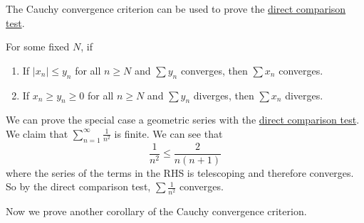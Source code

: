   The Cauchy convergence criterion can be used to prove the \hyperref[thm:direct-comparison-test]{direct comparison test}. 

  \begin{theorem}
    \label{thm:direct-comparison-test}
 
    For some fixed $N$, if 
    \begin{enumerate}
      \item If $|x_n| \leq y_n$ for all $n \geq N$ and $\sum y_n$ converges, then $\sum x_n$ converges. 
      \item If $x_n \geq y_n \geq 0$ for all $n \geq N$  and $\sum y_n$ diverges, then $\sum x_n$ diverges. 
    \end{enumerate}
  \end{theorem} 

  \begin{example}
    \label{ex:comparison-with-telescoping-series}
    We can prove the special case a geometric series with the \hyperref[thm:direct-comparison-test]{direct comparison test}. We claim that $\sum_{n=1}^\infty \frac{1}{n^2}$ is finite. We can see that 
    \begin{equation}
      \frac{1}{n^2} \leq \frac{2}{n (n+1)} 
    \end{equation}
    where the series of the terms in the RHS is telescoping and therefore converges. So by the direct comparison test, $\sum \frac{1}{n^2}$ converges. 
  \end{example}

  Now we prove another corollary of the Cauchy convergence criterion.   

